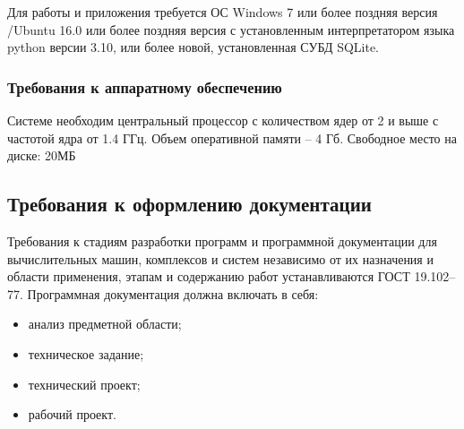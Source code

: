 Для работы и приложения требуется ОС Windows 7 или более поздняя версия /Ubuntu 16.0 или более поздняя версия с установленным интерпретатором языка python версии 3.10, или более новой, установленная СУБД SQLite.

\subsubsection{Требования к аппаратному обеспечению}
Системе необходим центральный процессор с количеством ядер от 2 и выше с частотой ядра от 1.4 ГГц. Объем оперативной памяти – 4 Гб.
Свободное место на диске: 20МБ

\subsection{Требования к оформлению документации}

Требования к стадиям разработки программ и программной документации для вычислительных машин, комплексов и систем независимо от их
назначения и области применения, этапам и содержанию работ устанавливаются ГОСТ  19.102–77. Программная документация должна включать в себя:
\begin{itemize}
	\item анализ предметной области;
	\item техническое задание;
	\item технический проект;
	\item рабочий проект.
\end{itemize}
